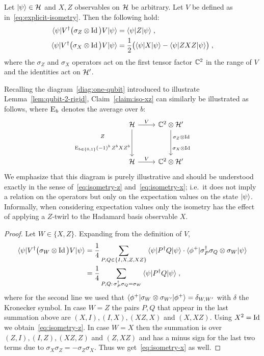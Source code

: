 \begin{claim}\label{claim:iso-xz}
Let $|\psi\rangle \in \mathcal{H}$ and $X,Z$ observables on $\mathcal{H}$ be arbitrary. Let $V$ be defined as in~\eqref{eq:explicit-isometry}. Then the following hold:
\begin{align}
\langle\psi| V^\dagger \big(\sigma_Z \otimes \mathop{\rm Id}\nolimits\big) V |\psi\rangle &= \langle\psi| Z |\psi\rangle\;,\label{eq:isometry-z}\\
\langle\psi| V^\dagger \big(\sigma_X \otimes \mathop{\rm Id}\nolimits\big) V |\psi\rangle &= \frac{1}{2} \big(  \langle\psi| X |\psi\rangle -  \langle\psi| ZXZ |\psi\rangle \big)\;,\label{eq:isometry-x}
\end{align}
where the $\sigma_Z$ and $\sigma_X$ operators act on the first tensor factor $\mathbb{C}^2$ in the range of $V$ and the identities act on $\mathcal{H}'$. 
\end{claim}

Recalling the diagram~\ref{diag:one-qubit} introduced to illustrate Lemma~\ref{lem:qubit-2-rigid}, Claim~\ref{claim:iso-xz} can similarly be illustrated as follows, where $\textsc{E}_{b}$ denotes the average over $b$:
\begin{equation}\label{diag:one-qubit-b}
\begin{tikzcd}
\mH  \arrow{r}{V}  \arrow[swap]{dd}{\substack{Z \\[3mm] \Es{b\in\{0,1\}} (-1)^b\, Z^bXZ^b }} &  \C^2 \otimes \mH' \arrow{dd}{\substack{\sigma_Z\otimes \Id\\[3mm] \sigma_X\otimes \Id}} \\
&\\ 
\mH  \arrow{r}{V} & \C^2 \otimes \mH'
\end{tikzcd}
\end{equation}
We emphasize that this diagram is purely illustrative and should be understood exactly in the sense of~\eqref{eq:isometry-z} and~\eqref{eq:isometry-x}; i.e.\ it does not imply a relation on the operators but only on the expectation values on the state $|\psi\rangle$. Informally, when considering expectation values only the isometry has the effect of applying a $Z$-twirl to the Hadamard basis observable $X$. 

\begin{proof}
Let $W\in\{X,Z\}$. Expanding from the definition of $V$,
\begin{align*}
\langle\psi| V^\dagger \big(\sigma_W \otimes \mathop{\rm Id}\nolimits\big) V |\psi\rangle
&= \frac{1}{4}\sum_{P,Q\in \{I,X,Z,XZ\}} \,\langle\psi| P^\dagger Q |\psi\rangle\cdot \langle\phi^+| \sigma_P^\dagger \sigma_Q \otimes \sigma_W |\psi\rangle\\
&= \frac{1}{4}\sum_{P,Q:\, \sigma_P^\dagger \sigma_Q = \sigma_W} \,\langle\psi| P^\dagger Q |\psi\rangle\;,
\end{align*}
where for the second line we used that $\langle\phi^+| \sigma_W \otimes \sigma_{W'} |\phi^+\rangle = \delta_{W,W'}$ with $\delta$ the Kronecker symbol. In case $W=Z$ the pairs $P,Q$ that appear in the last summation above are $(X,I),(I,X),(XZ,X)$ and $(X,XZ)$. Using $X^2 = \mathop{\rm Id}\nolimits$ we obtain~\eqref{eq:isometry-z}. In case $W=X$ then the summation is over $(Z,I),(I,Z),(XZ,Z)$ and $(Z,XZ)$ and has a minus sign for the last two terms due to $\sigma_X\sigma_Z = -\sigma_Z\sigma_X$. Thus we get~\eqref{eq:isometry-x} as well. 
\end{proof}

